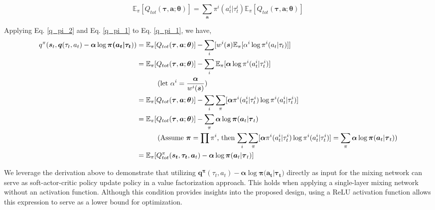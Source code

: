 \begin{equation}
\mathbb{E}_{\pi} [Q_{tot}(\boldsymbol{\tau}, \boldsymbol{a} ; \boldsymbol{\theta})] = \sum_{\boldsymbol{a}} {\pi^{i}}({a}_{t}^{i} |{\tau}_{t}^{i}) \mathbb{E}_{\pi} [Q_{tot}(\boldsymbol{\tau}, \boldsymbol{a} ; \boldsymbol{\theta})] 
\label{q_pi_3}
\end{equation}

Applying Eq. \ref{q_pi_2} and Eq. \ref{q_pi_1} to Eq. \ref{q_pi_1}, we have,
\begin{equation}
\begin{aligned}
q^{\pi}(\boldsymbol{s}_{t}, \boldsymbol{q}(\tau_{t}, a_{t}) - \boldsymbol{\alpha} \log \boldsymbol{\pi(a_{t}| \tau_{t}})) &= \mathbb{E}_{\pi} [Q_{tot}(\boldsymbol{\tau}, \boldsymbol{a} ; \boldsymbol{\theta})] - \sum_{i}[ w^{i}(\boldsymbol{s})\mathbb{E}_{\pi} [\alpha^{i} \log {\pi^{i}}({a}_{t} |{\tau}_{t})]] \\
  &= \mathbb{E}_{\pi} [Q_{tot}(\boldsymbol{\tau}, \boldsymbol{a} ; \boldsymbol{\theta})] -\sum_{i} \mathbb{E}_{\pi} [\boldsymbol{\alpha} \log {\pi^{i}}({a}_{t}^{i} |{\tau}_{t}^{i})] \\
& \text{\hspace{3em}(let $\alpha^{i} =  \frac{\boldsymbol\alpha}{w^{i}(\boldsymbol{s})}$)} \\
&= \mathbb{E}_{\pi} [Q_{tot}(\boldsymbol{\tau}, \boldsymbol{a} ; \boldsymbol{\theta})] - \sum_{i}\sum_{\pi} [\boldsymbol{\alpha}\pi^{i} ({a}_{t}^{i} |{\tau}_{t}^{i})\log {\pi^{i}}({a}_{t}^{i} |{\tau}_{t}^{i})] \\ 
& = \mathbb{E}_{\pi} [Q_{tot}(\boldsymbol{\tau}, \boldsymbol{a} ; \boldsymbol{\theta})] - \sum_{\pi} \boldsymbol{\alpha} \log \boldsymbol{\pi}(\boldsymbol{a}_{t} |\boldsymbol{\tau}_{t}) \\
& \text{\hspace{3em}(Assume $\boldsymbol\pi = \prod \pi^{i}$, then $\sum_{i}\sum_{\pi} [\boldsymbol{\alpha}\pi^{i} ({a}_{t}^{i} |{\tau}_{t}^{i})\log {\pi^{i}}({a}_{t}^{i} |{\tau}_{t}^{i})] = \sum_{\pi} \boldsymbol{\alpha} \log \boldsymbol{\pi}(\boldsymbol{a}_{t} |\boldsymbol{\tau}_{t})$}) \\
& = \mathbb{E}_{\pi}[ Q^{\pi}_{tot}(\boldsymbol{s_{t}}, \boldsymbol{\tau_{t}}, \boldsymbol{a}_{t})-\boldsymbol\alpha \log \boldsymbol{\pi}(\boldsymbol{a}_{t} | \boldsymbol{\tau}_{t})]\\
\end{aligned}
\end{equation}

We leverage the derivation above to demonstrate that utilizing  $\boldsymbol{q^\pi}(\tau_{t}, a_{t}) - \boldsymbol{\alpha} \log \boldsymbol{\pi(a_{t}| \tau_{t}})$ directly as input for the mixing network can serve as soft-actor-critic policy update policy in a value factorization approach. This holds when applying a single-layer mixing network without an activation function. Although this condition provides insights into the proposed design, using a ReLU activation function allows this expression to serve as a lower bound for optimization.







